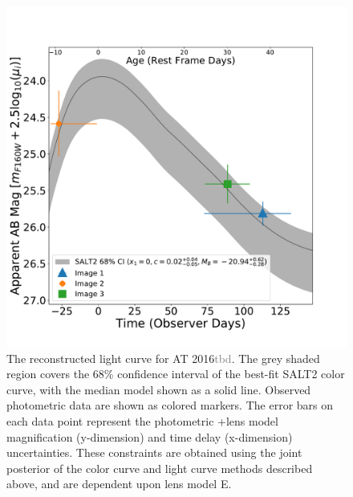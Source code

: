 \documentclass[12pt,dvipsnames]{article}
\def\SNABC{AT 2016{\textcolor{Gray}{tbd}}\xspace}
\begin{document}
\begin{figure}[h!]
    \centering
    \includegraphics[width=\textwidth]{Paper/Figures/full_lightcurve.pdf}
    \caption{\label{fig:full_lightcurve}The reconstructed light curve for \SNABC. The grey shaded region covers the 68\% confidence interval of the best-fit SALT2 color curve, with the median model shown as a solid line. Observed photometric data are shown as colored markers.   The error bars on each data point represent the photometric +lens model magnification (y-dimension) and time delay (x-dimension) uncertainties. These constraints are obtained using the joint posterior of the color curve and light curve methods described above, and are dependent upon lens model E.}
\end{figure}
\end{document}
